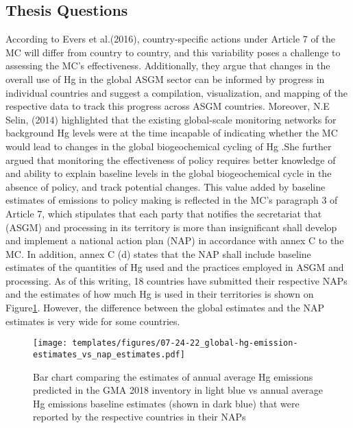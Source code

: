 \begin{flushleft}


\section{Thesis Questions}
According to Evers et al.(2016), country-specific actions under Article 7 of the MC will differ from country to country, and this variability poses a challenge to assessing the MC's effectiveness. Additionally, they argue that changes in the overall use of Hg in the global ASGM sector can be informed by progress in individual countries and suggest a compilation, visualization, and mapping of the respective data to track this progress across ASGM countries. Moreover, N.E Selin, (2014) highlighted that the existing global-scale monitoring networks for background Hg levels were at the time incapable of indicating whether the MC would lead to changes in the global biogeochemical cycling of Hg .She further argued that monitoring the effectiveness of policy requires better knowledge of and ability to explain baseline levels in the global biogeochemical cycle in the absence of policy, and track potential changes. This value added by baseline estimates of emissions to policy making is reflected in the MC's paragraph 3 of Article 7, which stipulates that each party that notifies the secretariat that (ASGM) and processing in its territory is more than insignificant shall develop and implement a national action plan (NAP) in accordance with annex C to the MC. In addition, annex C (d) states that the NAP shall include baseline estimates of the quantities of Hg used and the practices employed in ASGM and processing. As of this writing, 18 countries have submitted their respective NAPs and the estimates of how much Hg is used in their territories is shown on Figure\ref{fig:global-hg-emission-estimates_vs_nap_estimates}. However, the difference between the global estimates and the NAP estimates is very wide for some countries. 

\begin{figure}[H]
  \texttt{[image: templates/figures/07-24-22\_global-hg-emission-estimates\_vs\_nap\_estimates.pdf]}
  \centering
  \caption{Bar chart comparing the estimates of annual average Hg emissions predicted in the GMA 2018 inventory in light blue vs annual average Hg emissions baseline estimates (shown in dark blue) that were reported by the respective countries in their NAPs }
  \label{fig:global-hg-emission-estimates_vs_nap_estimates}
\end{figure}
\FloatBarrier


\end{flushleft}
